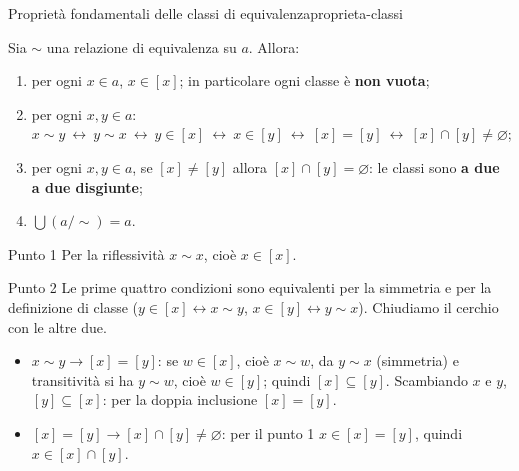 \begin{concetto}
\begin{Teorema}{Proprietà fondamentali delle classi di equivalenza}{proprieta-classi}
    \begin{prerequisiti}
    \end{prerequisiti}
    Sia $\sim$ una relazione di equivalenza su $a$. Allora:
    \begin{enumerate}
        \item per ogni $x \in a$, $x \in [x]$; in particolare ogni classe è \textbf{non vuota};
        \item per ogni $x, y \in a$:\quad
              $x \sim y \ \leftrightarrow\ y \sim x \ \leftrightarrow\ y \in [x] \ \leftrightarrow\ x \in [y] \ \leftrightarrow\ [x] = [y]
              \ \leftrightarrow\ [x] \cap [y] \neq \varnothing$;
        \item per ogni $x, y \in a$, se $[x] \neq [y]$ allora $[x] \cap [y] = \varnothing$: le classi sono \textbf{a due a due disgiunte};
        \item $\bigcup (a/{\sim}) = a$.
    \end{enumerate}
\end{Teorema}
\begin{dimostrazione}
    \begin{caso}{Punto 1}
        Per la riflessività $x \sim x$, cioè $x \in [x]$.
    \end{caso}
    \begin{caso}{Punto 2}
        Le prime quattro condizioni sono equivalenti per la simmetria e per la definizione di classe
        ($y \in [x] \leftrightarrow x \sim y$, $x \in [y] \leftrightarrow y \sim x$). Chiudiamo il cerchio con le altre due.
        \begin{itemize}
            \item[] $x \sim y \rightarrow [x] = [y]$: se $w \in [x]$, cioè $x \sim w$, da $y \sim x$ (simmetria) e transitività si ha
                    $y \sim w$, cioè $w \in [y]$; quindi $[x] \subseteq [y]$. Scambiando $x$ e $y$, $[y] \subseteq [x]$: per la doppia
                    inclusione $[x] = [y]$.
            \item[] $[x] = [y] \rightarrow [x] \cap [y] \neq \varnothing$: per il punto 1 $x \in [x] = [y]$, quindi $x \in [x] \cap [y]$.

\end{itemize}
\end{caso}
\end{dimostrazione}
\end{concetto}
